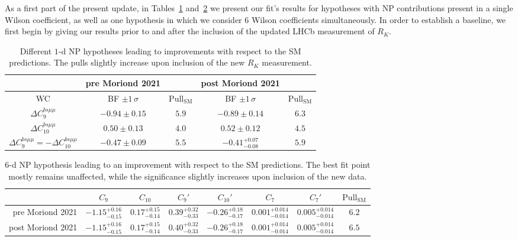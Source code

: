 \documentclass[a4paper,11pt]{article}
\def\rk{R_{K}}
\begin{document}
As a first part of the present update, 
in Tables~\ref{tab:1d} and~\ref{tab:6d} we present our fit's results for hypotheses with NP contributions present in a single Wilson coefficient, as well as one hypothesis in which we consider 6 Wilson coefficients simultaneously. 
In order to establish a baseline, 
we first begin by giving our results prior to and after 
the inclusion of the updated LHCb measurement of $\rk$.
\begin{table}[h!]

    \centering
    \begin{tabular}{|c||c|c||c|c|}
    \hline
    & {pre Moriond 2021} & & post Moriond 2021 & \\
    \hline
    { WC} & BF $\pm 1\,\sigma$ & $\mathrm{Pull}_\mathrm{SM}$ & BF $\pm 1\,\sigma$ & $\mathrm{Pull}_\mathrm{SM}$\\
    \hline
    $\Delta C_9^{bs\mu\mu}$ & $-0.94 \pm 0.15$ & $5.9$ & $-0.89 \pm 0.14$ & ${6.3}$\\
    \hline
    $\Delta C_{10}^{bs\mu\mu}$ & $0.50 \pm 0.13$ & $4.0$ & $0.52 \pm 0.12$ & ${4.5}$\\
    \hline
    $\Delta C_9^{bs\mu\mu} = - \Delta C_{10}^{bs\mu\mu}$ & $-0.47 \pm 0.09$ & $5.5 $ & $-0.41^{+0.07}_{-0.08}$ & ${5.9}$\\
    \hline
    \end{tabular}
    \caption{Different $1$-d NP hypotheses leading to improvements with respect to the SM predictions. The pulls slightly increase upon inclusion of the new $\rk$ measurement.}
    \label{tab:1d}
\end{table}

\begin{table}[]
    
    \centering
    \hspace*{-3mm}\begin{tabular}{|r||c|c|c|c|c|c|c|}
    \hline
    & $C_9$ & $C_{10}$ & $C_9'$ & $C_{10}'$ & $C_7$ & $C_7'$ &$\mathrm{Pull}_\mathrm{SM}$ \\
    \hline
    pre Moriond 2021 & $-1.15^{+0.16}_{-0.15}$ & $0.17^{+0.15}_{-0.14}$ & $0.39^{+0.32}_{-0.33}$ & $-0.26^{+0.18}_{-0.17}$ & $0.001^{+0.014}_{-0.014}$ & $0.005^{+0.014}_{-0.014}$ & $6.2$\\
    \hline
    \hline
    post Moriond 2021 & $-1.15^{+0.16}_{-0.15}$ & $0.17^{+0.15}_{-0.14}$ & ${0.40}^{+0.32}_{-0.33}$ & $-0.26^{+0.18}_{-0.17}$ & $0.001^{+0.014}_{-0.014}$ & $0.005^{+0.014}_{-0.014}$ & ${6.5}$\\
    \hline
    \end{tabular}
    \caption{$6$-d NP hypothesis leading to an improvement with respect to the SM predictions. The best fit point mostly remains unaffected, while the significance slightly increases upon inclusion of the new data.}
    \label{tab:6d}
\end{table}
\end{document}
